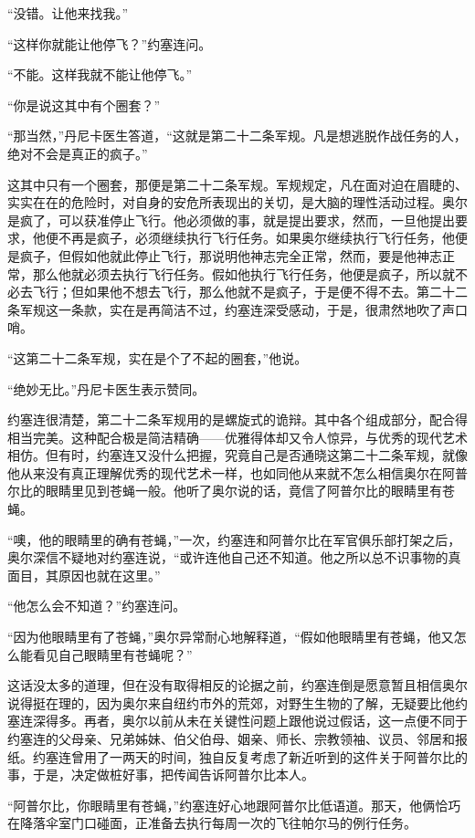     “没错。让他来找我。”

    “这样你就能让他停飞？”约塞连问。

    “不能。这样我就不能让他停飞。”

    “你是说这其中有个圈套？”

    “那当然，”丹尼卡医生答道，“这就是第二十二条军规。凡是想逃脱作战任务的人，绝对不会是真正的疯子。”

    这其中只有一个圈套，那便是第二十二条军规。军规规定，凡在面对迫在眉睫的、实实在在的危险时，对自身的安危所表现出的关切，是大脑的理性活动过程。奥尔是疯了，可以获准停止飞行。他必须做的事，就是提出要求，然而，一旦他提出要求，他便不再是疯子，必须继续执行飞行任务。如果奥尔继续执行飞行任务，他便是疯子，但假如他就此停止飞行，那说明他神志完全正常，然而，要是他神志正常，那么他就必须去执行飞行任务。假如他执行飞行任务，他便是疯子，所以就不必去飞行；但如果他不想去飞行，那么他就不是疯子，于是便不得不去。第二十二条军规这一条款，实在是再简洁不过，约塞连深受感动，于是，很肃然地吹了声口哨。

    “这第二十二条军规，实在是个了不起的圈套，”他说。

    “绝妙无比。”丹尼卡医生表示赞同。

    约塞连很清楚，第二十二条军规用的是螺旋式的诡辩。其中各个组成部分，配合得相当完美。这种配合极是简洁精确——优雅得体却又令人惊异，与优秀的现代艺术相仿。但有时，约塞连又没什么把握，究竟自己是否通晓这第二十二条军规，就像他从来没有真正理解优秀的现代艺术一样，也如同他从来就不怎么相信奥尔在阿普尔比的眼睛里见到苍蝇一般。他听了奥尔说的话，竟信了阿普尔比的眼睛里有苍蝇。

    “噢，他的眼睛里的确有苍蝇，”一次，约塞连和阿普尔比在军官俱乐部打架之后，奥尔深信不疑地对约塞连说，“或许连他自己还不知道。他之所以总不识事物的真面目，其原因也就在这里。”

    “他怎么会不知道？”约塞连问。

    “因为他眼睛里有了苍蝇，”奥尔异常耐心地解释道，“假如他眼睛里有苍蝇，他又怎么能看见自己眼睛里有苍蝇呢？”

    这话没太多的道理，但在没有取得相反的论据之前，约塞连倒是愿意暂且相信奥尔说得挺在理的，因为奥尔来自纽约市外的荒郊，对野生生物的了解，无疑要比他约塞连深得多。再者，奥尔以前从未在关键性问题上跟他说过假话，这一点便不同于约塞连的父母亲、兄弟姊妹、伯父伯母、姻亲、师长、宗教领袖、议员、邻居和报纸。约塞连曾用了一两天的时间，独自反复考虑了新近听到的这件关于阿普尔比的事，于是，决定做桩好事，把传闻告诉阿普尔比本人。
 


    “阿普尔比，你眼睛里有苍蝇，”约塞连好心地跟阿普尔比低语道。那天，他俩恰巧在降落伞室门口碰面，正准备去执行每周一次的飞往帕尔马的例行任务。

